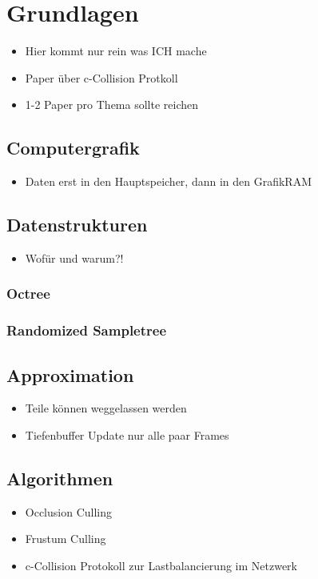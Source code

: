 \chapter{Grundlagen}

\begin{itemize}
 \item Hier kommt nur rein was ICH mache
 
 \item Paper über c-Collision Protkoll
 \item 1-2 Paper pro Thema sollte reichen
\end{itemize}


\section{Computergrafik}
\begin{itemize}
 \item Daten erst in den Hauptspeicher, dann in den GrafikRAM
\end{itemize}

\section{Datenstrukturen}
\begin{itemize}
 \item Wofür und warum?!
\end{itemize}

\subsection{Octree}
\subsection{Randomized Sampletree}
\section{Approximation}
\begin{itemize}
 \item Teile können weggelassen werden
 \item Tiefenbuffer Update nur alle paar Frames
\end{itemize}

\section{Algorithmen}
\begin{itemize}
 \item Occlusion Culling
 \item Frustum Culling
 \item c-Collision Protokoll zur Lastbalancierung im Netzwerk
\end{itemize}

